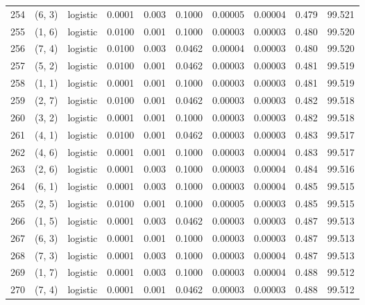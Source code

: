 \begin{tabular}{lllrrrrrrr}
254 &      (6, 3) &  logistic &  0.0001 &  0.003 &  0.1000 &          0.00005 &    0.00004 &       0.479 &    99.521 \\
255 &      (1, 6) &  logistic &  0.0100 &  0.001 &  0.1000 &          0.00003 &    0.00003 &       0.480 &    99.520 \\
256 &      (7, 4) &  logistic &  0.0100 &  0.003 &  0.0462 &          0.00004 &    0.00003 &       0.480 &    99.520 \\
257 &      (5, 2) &  logistic &  0.0100 &  0.001 &  0.0462 &          0.00003 &    0.00003 &       0.481 &    99.519 \\
258 &      (1, 1) &  logistic &  0.0001 &  0.001 &  0.1000 &          0.00003 &    0.00003 &       0.481 &    99.519 \\
259 &      (2, 7) &  logistic &  0.0100 &  0.001 &  0.0462 &          0.00003 &    0.00003 &       0.482 &    99.518 \\
260 &      (3, 2) &  logistic &  0.0001 &  0.001 &  0.1000 &          0.00003 &    0.00003 &       0.482 &    99.518 \\
261 &      (4, 1) &  logistic &  0.0100 &  0.001 &  0.0462 &          0.00003 &    0.00003 &       0.483 &    99.517 \\
262 &      (4, 6) &  logistic &  0.0001 &  0.001 &  0.1000 &          0.00003 &    0.00004 &       0.483 &    99.517 \\
263 &      (2, 6) &  logistic &  0.0001 &  0.003 &  0.1000 &          0.00003 &    0.00004 &       0.484 &    99.516 \\
264 &      (6, 1) &  logistic &  0.0001 &  0.003 &  0.1000 &          0.00003 &    0.00004 &       0.485 &    99.515 \\
265 &      (2, 5) &  logistic &  0.0100 &  0.001 &  0.1000 &          0.00005 &    0.00003 &       0.485 &    99.515 \\
266 &      (1, 5) &  logistic &  0.0001 &  0.003 &  0.0462 &          0.00003 &    0.00003 &       0.487 &    99.513 \\
267 &      (6, 3) &  logistic &  0.0001 &  0.001 &  0.1000 &          0.00003 &    0.00003 &       0.487 &    99.513 \\
268 &      (7, 3) &  logistic &  0.0001 &  0.003 &  0.1000 &          0.00003 &    0.00004 &       0.487 &    99.513 \\
269 &      (1, 7) &  logistic &  0.0001 &  0.003 &  0.1000 &          0.00003 &    0.00004 &       0.488 &    99.512 \\
270 &      (7, 4) &  logistic &  0.0001 &  0.001 &  0.0462 &          0.00003 &    0.00003 &       0.488 &    99.512 \\

\end{tabular}
